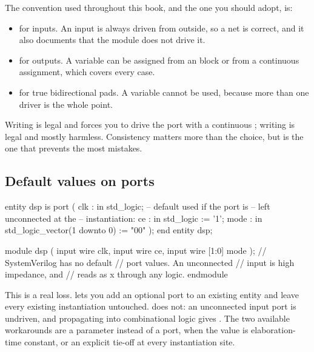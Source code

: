 The convention used throughout this book, and the one you should adopt, is:

\begin{itemize}
  \item {} for inputs. An input is always driven from outside,
        so a net is correct, and it also documents that the module does not
        drive it.
  \item {} for outputs. A variable can be assigned from an
         block or from a continuous assignment, which covers every
        \RTL{} case.
  \item {} for true bidirectional pads. A variable cannot be
        used, because more than one driver is the whole point.
\end{itemize}

Writing  is legal and forces you to drive the port with a
continuous ; writing  is legal and mostly
harmless. Consistency matters more than the choice, but  is
the one that prevents the most mistakes.

\subsection{Default values on ports}

\begin{rosetta}
\begin{rleft}
entity dsp is
  port (
    clk  : in std_logic;
    -- default used if the port is
    -- left unconnected at the
    -- instantiation:
    ce   : in std_logic := '1';
    mode : in std_logic_vector(1 downto 0)
            := "00"
  );
end entity dsp;
\end{rleft}
\begin{rright}
module dsp (
  input wire       clk,
  input wire       ce,
  input wire [1:0] mode
);
  // SystemVerilog has no default
  // port values. An unconnected
  // input is high impedance, and
  // reads as x through any logic.
endmodule
\end{rright}
\end{rosetta}

This is a real loss. \VHDL{} lets you add an optional port to an existing
entity and leave every existing instantiation untouched. \SV{} does not: an
unconnected input port is undriven, and  propagating into combinational
logic gives . The two available workarounds are a parameter instead of
a port, when the value is elaboration-time constant, or an explicit tie-off at
every instantiation site.

